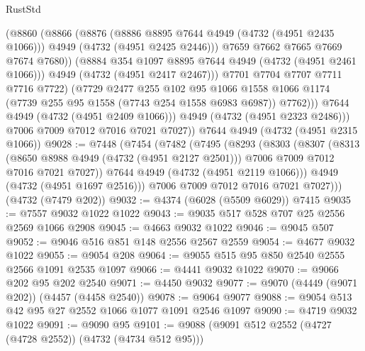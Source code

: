 \begin{lexlean}{RustStd}
\begin{coremodule}
                    (@8860
                      (@8866
                        (@8876
                          (@8886 @8895 @7644 @4949 (@4732 (@4951 @2435 @1066)))
                          @4949
                          (@4732 (@4951 @2425 @2446)))
                        @7659
                        @7662
                        @7665
                        @7669
                        @7674
                        @7680))
                    (@8884 @354 @1097 @8895 @7644 @4949 (@4732 (@4951 @2461 @1066)))
                    @4949
                    (@4732 (@4951 @2417 @2467)))
                  @7701
                  @7704
                  @7707
                  @7711
                  @7716
                  @7722)
                (@7729
                  @2477
                  @255
                  @102
                  @95
                  @1066
                  @1558
                  @1066
                  @1174
                  (@7739 @255 @95 @1558 (@7743 @254 @1558 @6983 @6987))
                  @7762)))
            @7644
            @4949
            (@4732 (@4951 @2409 @1066)))
          @4949
          (@4732 (@4951 @2323 @2486)))
        @7006
        @7009
        @7012
        @7016
        @7021
        @7027))
    @7644
    @4949
    (@4732 (@4951 @2315 @1066))
@9028 := @7448
    (@7454
      (@7482
        (@7495
          (@8293
            (@8303
              (@8307
                (@8313
                  (@8650 @8988 @4949 (@4732 (@4951 @2127 @2501)))
                  @7006
                  @7009
                  @7012
                  @7016
                  @7021
                  @7027))
              @7644
              @4949
              (@4732 (@4951 @2119 @1066)))
            @4949
            (@4732 (@4951 @1697 @2516)))
          @7006
          @7009
          @7012
          @7016
          @7021
          @7027)))
    (@4732 (@7479 @202))
@9032 := @4374 (@6028 (@5509 @6029)) @7415
@9035 := @7557 @9032 @1022 @1022
@9043 := @9035 @517 @528 @707 @25 @2556 @2569 @1066 @2908
@9045 := @4663 @9032 @1022
@9046 := @9045 @507
@9052 := @9046 @516 @851 @148 @2556 @2567 @2559
@9054 := @4677 @9032 @1022
@9055 := @9054 @208
@9064 := @9055 @515 @95 @850 @2540 @2555 @2566 @1091 @2535 @1097
@9066 := @4441 @9032 @1022
@9070 := @9066 @202 @95 @202 @2540
@9071 := @4450 @9032
@9077 := @9070 (@4449 (@9071 @202)) (@4457 (@4458 @2540))
@9078 := @9064 @9077
@9088 := @9054 @513 @42 @95 @27 @2552 @1066 @1077 @1091 @2546 @1097
@9090 := @4719 @9032 @1022
@9091 := @9090 @95
@9101 := @9088 (@9091 @512 @2552 (@4727 (@4728 @2552)) (@4732 (@4734 @512 @95)))

\end{coremodule}
\end{lexlean}
